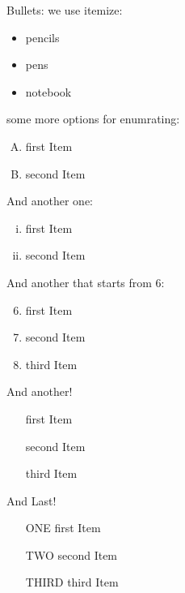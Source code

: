 \documentclass[11pt]{article}
\begin{document}
Bullets: we use itemize:
\begin{itemize}

\item pencils
\item pens
\item notebook

\end{itemize}

some more options for enumrating:
\begin{enumerate}[A.]
\item first Item
\item second Item

\end{enumerate}

And another one:
\begin{enumerate}[i.]
\item first Item
\item second Item

\end{enumerate}

\pagebreak

And another that starts from 6:

\begin{enumerate} \setcounter{enumi}{5}
\item first Item
\item second Item
\item third Item

\end{enumerate}

And another!
\begin{enumerate}
\item[] first Item
\item[] second Item
\item[] third Item

\end{enumerate}

And Last!
\begin{enumerate}
\item[ONE] first Item
\item[TWO] second Item
\item[THIRD] third Item

\end{enumerate}
\end{document}
